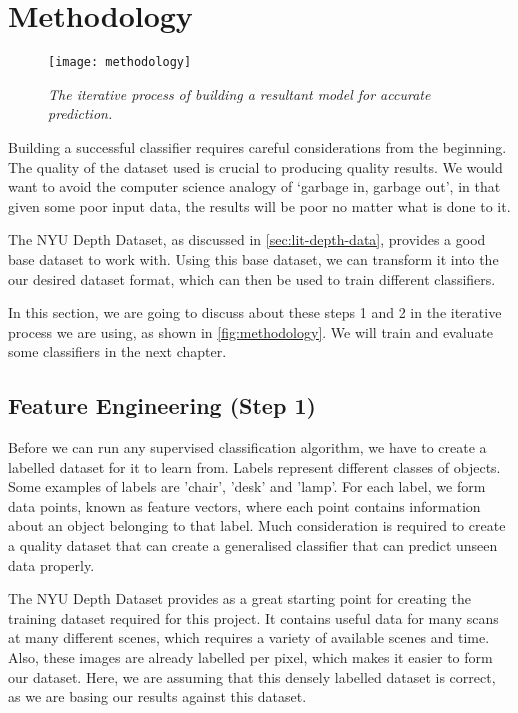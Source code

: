 \chapter{Methodology} \label{chap:methodology}

\begin{figure}[h]
  \centering
  \texttt{[image: methodology]}
  \caption{\textit{The iterative process of building a resultant model for accurate prediction.}}
  \label{fig:methodology}
\end{figure}

Building a successful classifier requires careful considerations from the beginning. The quality of the dataset used is crucial to producing quality results. We would want to avoid the computer science analogy of `garbage in, garbage out', in that given some poor input data, the results will be poor no matter what is done to it. 

The NYU Depth Dataset, as discussed in \autoref{sec:lit-depth-data}, provides a good base dataset to work with. Using this base dataset, we can transform it into the our desired dataset format, which can then be used to train different classifiers. 

In this section, we are going to discuss about these steps 1 and 2 in the iterative process we are using, as shown in \autoref{fig:methodology}. We will train and evaluate some classifiers in the next chapter.

\section{Feature Engineering (Step 1)}
Before we can run any supervised classification algorithm, we have to create a labelled dataset for it to learn from. Labels represent different classes of objects. Some examples of labels are 'chair', 'desk' and 'lamp'. For each label, we form data points, known as feature vectors, where each point contains information about an object belonging to that label. Much consideration is required to create a quality dataset that can create a generalised classifier that can predict unseen data properly.

The NYU Depth Dataset provides as a great starting point for creating the training dataset required for this project. It contains useful data for many scans at many different scenes, which requires a variety of available scenes and time. Also, these images are already labelled per pixel, which makes it easier to form our dataset. Here, we are assuming that this densely labelled dataset is correct, as we are basing our results against this dataset.

